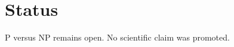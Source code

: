 \documentclass[11pt]{article}
\begin{document}
\section{Status}
P versus NP remains open. No scientific claim was promoted.

\end{document}
